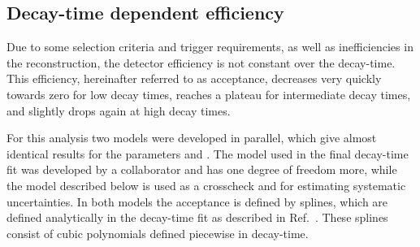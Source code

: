 \subsection{Decay-time dependent efficiency}
\label{sec:acceptance}

Due to some selection criteria and trigger requirements, as well as inefficiencies in the \velo reconstruction, the detector efficiency is not constant over the \Bz decay-time.
This efficiency, hereinafter referred to as acceptance, decreases very quickly towards zero for low decay times, reaches a plateau for intermediate decay times, and slightly drops again at high decay times.

For this analysis two models were developed in parallel, which give almost identical results for the \CP parameters \Sf and \Sfbar.
The model used in the final decay-time fit was developed by a collaborator and has one degree of freedom more, while the model described below is used as a crosscheck and for estimating systematic uncertainties.
In both models the acceptance is defined by splines, which are defined analytically in the decay-time fit as described in Ref.~\cite{Karbach:2014qba}.
These splines consist of cubic polynomials defined piecewise in decay-time.

